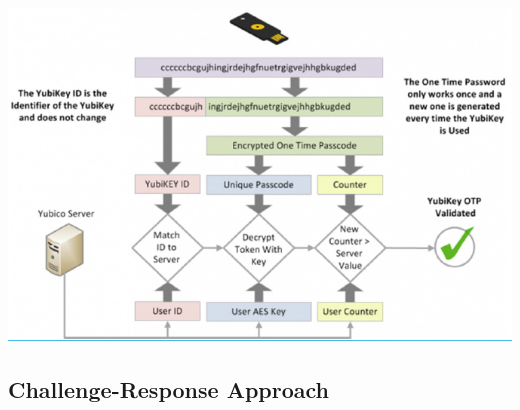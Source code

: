 \documentclass{article}
\begin{document}
\begin{center}
  \includegraphics[scale=0.5]{22}
\end{center}

\subsection{Challenge-Response Approach}
\end{document}
